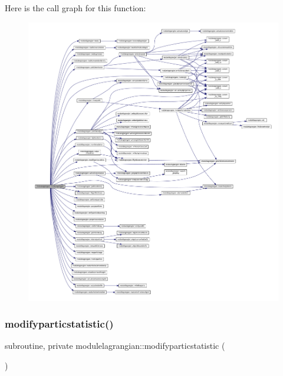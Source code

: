 Here is the call graph for this function\+:\nopagebreak
\begin{figure}[H]
\begin{center}
\leavevmode
\includegraphics[width=350pt]{namespacemodulelagrangian_a1097f962a7a848d12f7f3036993f7b93_cgraph}
\end{center}
\end{figure}
\mbox{\label{namespacemodulelagrangian_a101763d65fb26cd32c402a807ae7c733}} 
\subsubsection{\texorpdfstring{modifyparticstatistic()}{modifyparticstatistic()}}
{\footnotesize\ttfamily subroutine, private modulelagrangian\+::modifyparticstatistic (\begin{DoxyParamCaption}{ }\end{DoxyParamCaption})\hspace{0.3cm}{\ttfamily [private]}}

